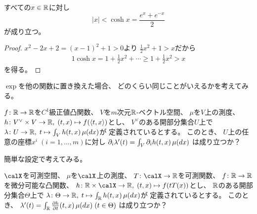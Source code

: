 \documentclass[report]{jlreq}
\begin{document}
\begin{proposition}
    すべての$x \in \mathbb{R}$に対し
    \begin{equation}
        |x| < \cosh x
            = \frac{e^x + e^{-x}}{2}
    \end{equation}
    が成り立つ。
\end{proposition}

\begin{proof}
    $x^2 - 2x + 2 = (x - 1)^2 + 1 > 0$より
    $\frac{1}{2} x^2 + 1 > x$だから
    \begin{alignat}{1}
        \cosh x
            =
                1 + \frac{1}{2} x^2 + \cdots
            \ge
                1 + \frac{1}{2} x^2
            >
                x
    \end{alignat}
    を得る。
\end{proof}

$\exp$を他の関数に置き換えた場合、
どのくらい同じことがいえるかを考えてみる。

\begin{problem}
    $f \colon \mathbb{R} \to \mathbb{R}$を$C^1$級正値凸関数、
    $V$を$m$次元$\mathbb{R}$-ベクトル空間、
    $\mu$を$V$上の測度、
    $h \colon V^\vee \times V \to \mathbb{R}, \; (t, x) \mapsto f(\left\langle{t},{x}\right\rangle)$とし、
    $V^\vee$のある開部分集合$U$上で
    $\lambda \colon U \to \mathbb{R}, \; t \mapsto \int_V h(t, x) \, \mu(dx)$が
    定義されているとする。
    このとき、
    $U$上の任意の座標$x^i \; (i = 1, \dots, m)$に対し
    $\partial_i \lambda'(t) = \int_V \partial_i h(t, x) \, \mu(dx)$
    は成り立つか？
\end{problem}

簡単な設定で考えてみる。

\newpage
\begin{problem}
    $\calX$を可測空間、
    $\mu$を$\calX$上の測度、
    $T \colon \calX \to \R$を可測関数、
    $f \colon \mathbb{R} \to \mathbb{R}$を微分可能な凸関数、
    $h \colon \R \times \calX \to \R, \; (t, x) \mapsto f(tT(x))$とし、
    $\mathbb{R}$のある開部分集合$\Theta$上で
    $\lambda \colon \Theta \to \mathbb{R}, \; t \mapsto \int_{\mathbb{R}} h(t, x) \, \mu(dx)$が
    定義されているとする。
    このとき、
    $\lambda'(t) = \int_\R \deldel[h]{t} (t, x) \, \mu(dx) \; (t \in \Theta)$
    は成り立つか？
\end{problem}
\end{document}

